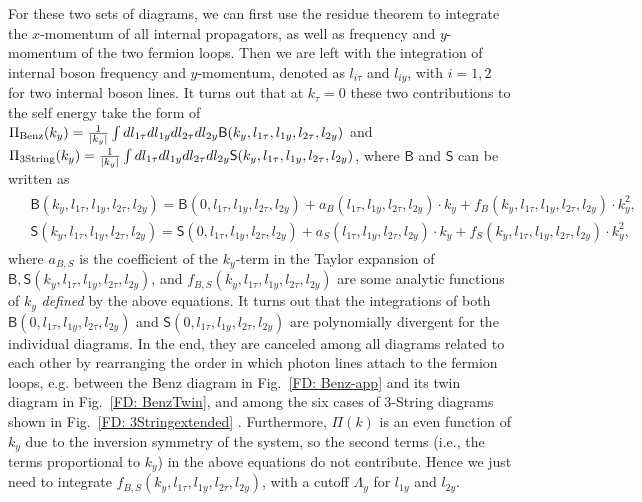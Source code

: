 \documentclass[prx,amsmath,amssymb, notitlepage, onecolumn,
nofootinbib,
superscriptaddress,
longbibliography
]{revtex4-1}
\newcommand{\beq}{\begin{eqnarray}}
\newcommand{\eeq}{\end{eqnarray}}
\newcommand{\ie}{{i.e., }}
\begin{document}
For these two sets of diagrams, we can first use the residue theorem to integrate the $x$-momentum of all internal propagators, as well as frequency and $y$-momentum of the two fermion loops. Then we are left with the integration of internal boson frequency and $y$-momentum, denoted as $l_{i\tau}$ and $l_{iy}$, with $i=1, 2$ for two internal boson lines. It turns out that at $k_\tau=0$ these two contributions to the self energy take the form of $\Pi_{\rm Benz}(k_y)=\frac{1}{|k_y|}\int dl_{1\tau}dl_{1y}dl_{2\tau}dl_{2y}\mathsf{B}(k_y, l_{1\tau}, l_{1y}, l_{2\tau}, l_{2y})$ and $\Pi_{\rm 3String}(k_y)=\frac{1}{|k_y|}\int dl_{1\tau}dl_{1y}dl_{2\tau}dl_{2y}\mathsf{S}(k_y, l_{1\tau}, l_{1y}, l_{2\tau}, l_{2y})$, 
where $\mathsf{B}$ and $\mathsf{S}$ can be written as
\beq
\begin{split}
&\mathsf{B}(k_y, l_{1\tau}, l_{1y}, l_{2\tau}, l_{2y}) = \mathsf{B}(0, l_{1\tau}, l_{1y}, l_{2\tau}, l_{2y}) +a_{B}(l_{1\tau}, l_{1y}, l_{2\tau}, l_{2y})\cdot k_y+f_B(k_y, l_{1\tau}, l_{1y}, l_{2\tau}, l_{2y})\cdot k_y^2,\\
&\mathsf{S}(k_y, l_{1\tau}, l_{1y}, l_{2\tau}, l_{2y}) = \mathsf{S}(0, l_{1\tau}, l_{1y}, l_{2\tau}, l_{2y}) +a_S(l_{1\tau}, l_{1y}, l_{2\tau}, l_{2y})\cdot k_y+f_S(k_y, l_{1\tau}, l_{1y}, l_{2\tau}, l_{2y})\cdot k_y^2,
\end{split}
\eeq
where $a_{B,S}$ is the coefficient of the $k_y$-term in the Taylor expansion of $\mathsf{B}, \mathsf{S}(k_y, l_{1\tau}, l_{1y}, l_{2\tau}, l_{2y})$, and $f_{B,S}(k_y, l_{1\tau}, l_{1y}, l_{2\tau}, l_{2y})$ are some analytic functions of $k_y$ {\it defined} by the above equations. It turns out that the integrations of both $\mathsf{B}(0, l_{1\tau}, l_{1y}, l_{2\tau}, l_{2y})$ and $\mathsf{S}(0, l_{1\tau}, l_{1y}, l_{2\tau}, l_{2y})$ are polynomially divergent for the individual diagrams. 
In the end, they are canceled among all diagrams related to each other by rearranging the order in which photon lines attach to the fermion loops, e.g. between the Benz diagram in Fig.~\ref{FD: Benz-app} and its twin diagram in Fig.~\ref{FD: BenzTwin}, and among the six cases of 3-String diagrams shown in Fig.~\ref{FD: 3Stringextended} \cite{Holder2015}. Furthermore, $\Pi(k)$ is an even function of $k_y$ due to the inversion symmetry of the system, so the second terms (\ie the terms proportional to $k_y$) in the above equations do not contribute. Hence we just need to integrate $f_{B,S}(k_y, l_{1\tau}, l_{1y}, l_{2\tau}, l_{2y})$, with a cutoff $\Lambda_y$ for $l_{1y}$ and $l_{2y}$.
 
\end{document}
